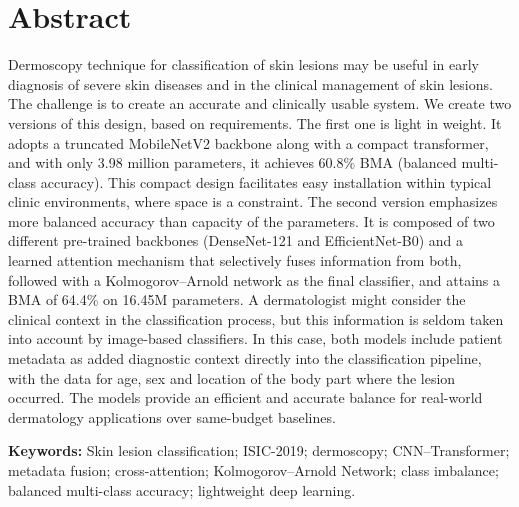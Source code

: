 \section*{Abstract}

Dermoscopy technique for classification of skin lesions may be useful in early
diagnosis of severe skin diseases and in the clinical management of skin
lesions. The challenge is to create an accurate and clinically usable system.
We create two versions of this design, based on requirements. The first one is
light in weight. It adopts a truncated MobileNetV2 backbone along with a compact
transformer, and with only 3.98 million parameters, it achieves 60.8\% BMA
(balanced multi-class accuracy). This compact design facilitates easy
installation within typical clinic environments, where space is a constraint.
The second version emphasizes more balanced accuracy than capacity of the
parameters. It is composed of two different pre-trained backbones
(DenseNet-121 and EfficientNet-B0) and a learned attention mechanism that
selectively fuses information from both, followed with a Kolmogorov--Arnold
network as the final classifier, and attains a BMA of 64.4\% on 16.45M
parameters. A dermatologist might consider the clinical context in the
classification process, but this information is seldom taken into account by
image-based classifiers. In this case, both models include patient metadata as
added diagnostic context directly into the classification pipeline, with the
data for age, sex and location of the body part where the lesion occurred. The
models provide an efficient and accurate balance for real-world dermatology
applications over same-budget baselines.

\vspace{1cm}
\textbf{Keywords:} Skin lesion classification; ISIC-2019; dermoscopy;
CNN--Transformer; metadata fusion; cross-attention; Kolmogorov--Arnold Network;
class imbalance; balanced multi-class accuracy; lightweight deep learning.
\pagebreak
